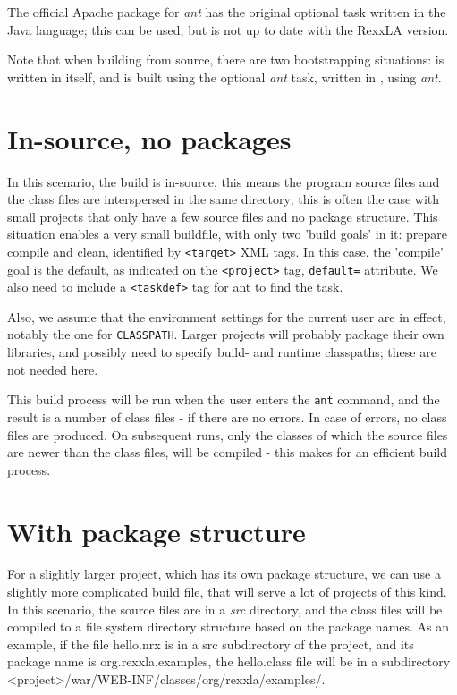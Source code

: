 The official Apache package for \emph{ant} has the original \nr{}
optional task written in the Java language; this can be used, but is
not up to date with the RexxLA version.

Note that when building \nr{} from source, there are two bootstrapping
situations: \nr{} is written in itself, and is built using the
optional \nr{} \emph{ant} task, written in \nr{}, using \emph{ant}.

\section{In-source, no packages}
In this scenario, the build is in-source, this means the program
source files and the class files are interspersed in the same
directory; this is often the case with small projects that only have a
few source files and no package structure. This situation enables a
very small buildfile, with only two 'build goals' in it: prepare compile and clean, identified by \texttt{<target>} XML tags. In this case, the
'compile' goal is the default, as indicated on the \texttt{<project>}
tag, \texttt{default=} attribute. We also need to include a
\texttt{<taskdef>} tag for ant to find the \nr{} task.

Also, we assume that the environment settings for the current user are
in effect, notably the one for \texttt{CLASSPATH}. Larger projects
will probably package their own libraries, and possibly need to
specify build- and runtime classpaths; these are not needed here.



This build process will be run when the user enters the \texttt{ant} command,
and the result is a number of class files - if there are no errors. In
case of errors, no class files are produced. On subsequent runs, only
the classes of which the source files are newer than the class files,
will be compiled - this makes for an efficient build process.

\section{With package structure}
For a slightly larger project, which has its own package structure, we
can use a slightly more complicated build file, that will serve a lot
of projects of this kind. In this scenario, the source files are in a
\emph{src} directory, and the class files will be compiled to a file
system directory structure based on the package names. As an example,
if the file hello.nrx is in a src subdirectory of the project, and its
package name is org.rexxla.examples, the hello.class file will be in a
subdirectory <project>/war/WEB-INF/classes/org/rexxla/examples/.

